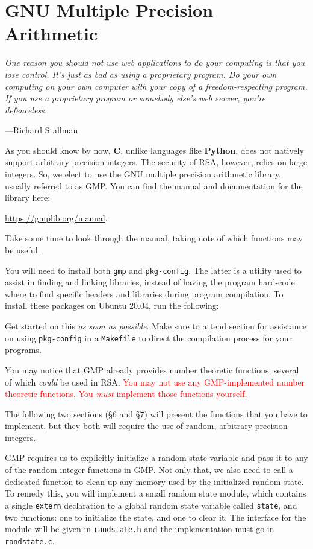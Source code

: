 \section{GNU Multiple Precision Arithmetic}
\epigraph{\emph{One reason you should not use web applications to do your computing is
that you lose control. It's just as bad as using a proprietary program. Do your own
computing on your own computer with your copy of a freedom-respecting program.
If you use a proprietary program or somebody else's web server, you're defenceless.}}{%
---Richard Stallman}

\noindent
As you should know by now, \textbf{C}, unlike languages like
\textbf{Python}, does not natively support arbitrary precision integers.
The security of RSA, however, relies on large integers. So, we elect to
use the GNU multiple precision arithmetic library, usually referred to
as GMP\@. You can find the manual and documentation for the library
here:
\centerline{\url{https://gmplib.org/manual}.}
Take some time to look through the manual, taking note of which
functions may be useful.

You will need to install both \texttt{gmp} and \texttt{pkg-config}. The
latter is a utility used to assist in finding and linking libraries,
instead of having the program hard-code where to find specific headers
and libraries during program compilation. To install these packages on
Ubuntu 20.04, run the following:


Get started on this \emph{as soon as possible}. Make sure to attend
section for assistance on using \texttt{pkg-config} in a
\texttt{Makefile} to direct the compilation process for your programs.

You may notice that GMP already provides number theoretic functions,
several of which \emph{could} be used in RSA. \textcolor{red}{You may
not use any GMP-implemented number theoretic functions. You \emph{must}
implement those functions yourself.}

The following two sections (\S6 and \S7) will present the functions that
you have to implement, but they both will require the use of random,
arbitrary-precision integers.

GMP requires us to explicitly initialize a random state variable and
pass it to any of the random integer functions in GMP\@. Not only that,
we also need to call a dedicated function to clean up any memory used by
the initialized random state. To remedy this, you will implement a small
random state module, which contains a single \texttt{extern} declaration
to a global random state variable called \texttt{state}, and two
functions: one to initialize the state, and one to clear it. The
interface for the module will be given in \texttt{randstate.h} and the
implementation must go in \texttt{randstate.c}.

